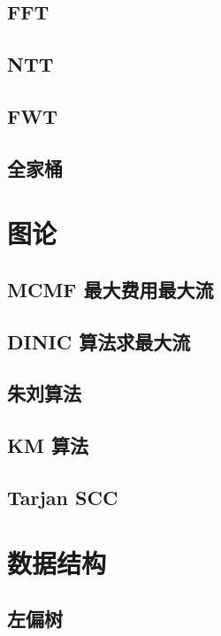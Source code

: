 \documentclass[a4paper,12pt]{article}
\begin{document}
\subsection{FFT}

\subsection{NTT}

\subsection{FWT}

\subsection{全家桶}


\section{图论}

\subsection{MCMF 最大费用最大流}

\subsection{DINIC 算法求最大流}

\subsection{朱刘算法}

\subsection{KM 算法}

\subsection{Tarjan SCC}


\section{数据结构}

\subsection{左偏树}

\end{document}
